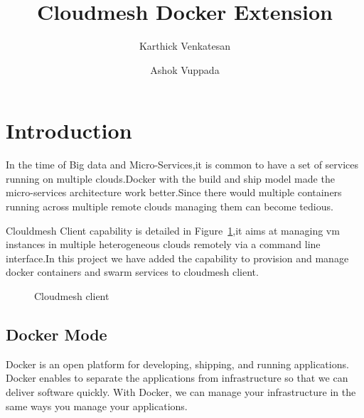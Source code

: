 \documentclass[9pt,twocolumn,twoside]{../../styles/osajnl}
\title{Cloudmesh Docker Extension}
\author[1]{Karthick Venkatesan}
\author[2]{Ashok Vuppada}
\affil[1]{School of Informatics and Computing, Bloomington, IN 47408, U.S.A.}
\begin{document}
\maketitle


\section{Introduction}
In the time of Big data and Micro-Services,it is common to have a set of services running on multiple clouds.Docker\cite{www-Docker} with the build and ship model made the micro-services architecture work better.Since there would multiple containers running across multiple remote clouds managing them can become tedious.

Clouldmesh Client\cite{las14cloudmeshmultiple} capability is detailed in Figure~\ref{fig:cmvm},it aims at managing vm instances in multiple heterogeneous clouds remotely via a command line interface.In this project we have added the capability to provision and manage docker\cite{www-Docker} containers  and swarm\cite{www-Swarm} services to cloudmesh client\cite{las14cloudmeshmultiple}.

\begin{figure}[h!]
\centering
{}
\caption{Cloudmesh client }
\label{fig:cmvm}
\end{figure}


\subsection{Docker Mode}

Docker is an open platform for developing, shipping, and running applications. Docker enables  to separate the applications from  infrastructure so that we can deliver software quickly. With Docker, we can manage your infrastructure in the same ways you manage your applications. 
\end{document}
